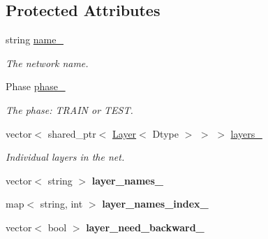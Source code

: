 \subsection*{Protected Attributes}
\begin{DoxyCompactItemize}
\item 
\mbox{\label{classcaffe_1_1_net_aef7021f31e355ab8f8991755125f6b2b}} 
string \mbox{\hyperlink{classcaffe_1_1_net_aef7021f31e355ab8f8991755125f6b2b}{name\+\_\+}}
\begin{DoxyCompactList}\small\item\em The network name. \end{DoxyCompactList}\item 
\mbox{\label{classcaffe_1_1_net_a1fe921a602b4f96602702a13ad605693}} 
Phase \mbox{\hyperlink{classcaffe_1_1_net_a1fe921a602b4f96602702a13ad605693}{phase\+\_\+}}
\begin{DoxyCompactList}\small\item\em The phase\+: T\+R\+A\+IN or T\+E\+ST. \end{DoxyCompactList}\item 
\mbox{\label{classcaffe_1_1_net_a8b4d825830d27aeb5ba907d9ddae05c5}} 
vector$<$ shared\+\_\+ptr$<$ \mbox{\hyperlink{classcaffe_1_1_layer}{Layer}}$<$ Dtype $>$ $>$ $>$ \mbox{\hyperlink{classcaffe_1_1_net_a8b4d825830d27aeb5ba907d9ddae05c5}{layers\+\_\+}}
\begin{DoxyCompactList}\small\item\em Individual layers in the net. \end{DoxyCompactList}\item 
\mbox{\label{classcaffe_1_1_net_aa8095da35fcec5221f41ba1736b18a81}} 
vector$<$ string $>$ {\bfseries layer\+\_\+names\+\_\+}
\item 
\mbox{\label{classcaffe_1_1_net_a494fc3c7c7bb0292fe185131d2a0f65f}} 
map$<$ string, int $>$ {\bfseries layer\+\_\+names\+\_\+index\+\_\+}
\item 
\mbox{\label{classcaffe_1_1_net_a7453bb63d82b05e991f9efefc5c9f25e}} 
vector$<$ bool $>$ {\bfseries layer\+\_\+need\+\_\+backward\+\_\+}
\item 
\mbox{\label{classcaffe_1_1_net_af567603bdcbadf89cde413b9042640b9}} 

\end{DoxyCompactItemize}

